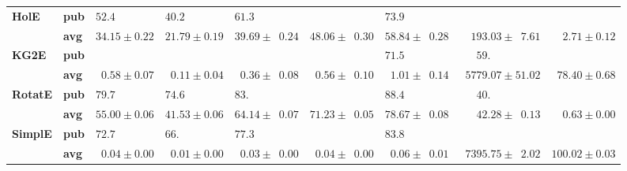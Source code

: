 \begin{tabular}{llrrrrrrr}
\textbf{HolE} & \textbf{pub} &  $52.4\phantom{0 \pm 0.00}$ &  $40.2\phantom{0 \pm 0.00}$ &            $61.3\phantom{0 \pm 00.00}$ &                                        &            $73.9\phantom{0 \pm 00.00}$ &                                           &                              \\
       & \textbf{avg} &            $34.15 \pm 0.22$ &            $21.79 \pm 0.19$ &            $39.69 \pm \phantom{0}0.24$ &            $48.06 \pm \phantom{0}0.30$ &            $58.84 \pm \phantom{0}0.28$ &  $\phantom{00}193.03 \pm \phantom{0}7.61$ &  $\phantom{00}2.71 \pm 0.12$ \\\midrule
\textbf{KG2E} & \textbf{pub} &                             &                             &                                        &                                        &            $71.5\phantom{0 \pm 00.00}$ &  $\phantom{000}59.\phantom{00 \pm 00.00}$ &                              \\
       & \textbf{avg} &  $\phantom{0}0.58 \pm 0.07$ &  $\phantom{0}0.11 \pm 0.04$ &  $\phantom{0}0.36 \pm \phantom{0}0.08$ &  $\phantom{0}0.56 \pm \phantom{0}0.10$ &  $\phantom{0}1.01 \pm \phantom{0}0.14$ &            $\phantom{0}5779.07 \pm 51.02$ &  $\phantom{0}78.40 \pm 0.68$ \\\midrule
\textbf{RotatE} & \textbf{pub} &  $79.7\phantom{0 \pm 0.00}$ &  $74.6\phantom{0 \pm 0.00}$ &            $83.\phantom{00 \pm 00.00}$ &                                        &            $88.4\phantom{0 \pm 00.00}$ &  $\phantom{000}40.\phantom{00 \pm 00.00}$ &                              \\
       & \textbf{avg} &            $55.00 \pm 0.06$ &            $41.53 \pm 0.06$ &            $64.14 \pm \phantom{0}0.07$ &            $71.23 \pm \phantom{0}0.05$ &            $78.67 \pm \phantom{0}0.08$ &  $\phantom{000}42.28 \pm \phantom{0}0.13$ &  $\phantom{00}0.63 \pm 0.00$ \\\midrule
\textbf{SimplE} & \textbf{pub} &  $72.7\phantom{0 \pm 0.00}$ &  $66.\phantom{00 \pm 0.00}$ &            $77.3\phantom{0 \pm 00.00}$ &                                        &            $83.8\phantom{0 \pm 00.00}$ &                                           &                              \\
       & \textbf{avg} &  $\phantom{0}0.04 \pm 0.00$ &  $\phantom{0}0.01 \pm 0.00$ &  $\phantom{0}0.03 \pm \phantom{0}0.00$ &  $\phantom{0}0.04 \pm \phantom{0}0.00$ &  $\phantom{0}0.06 \pm \phantom{0}0.01$ &  $\phantom{0}7395.75 \pm \phantom{0}2.02$ &            $100.02 \pm 0.03$ \\

\end{tabular}
